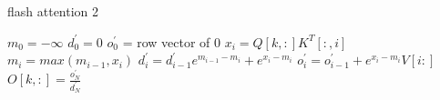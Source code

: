\documentclass[a4paper]{article}
\begin{document}
    \begin{algorithm}
        \caption{flash attention 2}
        \label{fa2}
        \begin{algorithmic}[1]
            \State $m_0 = -\infty$
            \State $d^\prime_0 = 0 $
            \State $o^\prime_{0}$ = row vector  of 0
                \State $x_{i} = Q[k,:]K^T[:,i] $
                \State $m_{i} =  max(m_{i-1}, x_{i})$
                \State $d^{\prime}_i = d^{\prime}_{i-1} e^{m_{i-1}-m_{i}} + e^{x_i - m_i}$
                \State $o^\prime_{i} = o^\prime_{i-1} + e^{x_i-m_i}V[i:]$
            \EndFor
            \State $O[k,:] =  \frac{o^\prime_{N}}{d^{\prime}_{N}}$
        \end{algorithmic}
    \end{algorithm}
\end{document}
